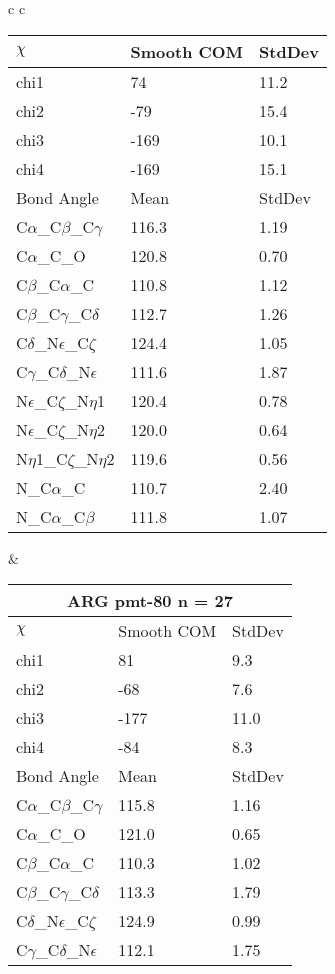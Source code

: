 \begin{longtable}{ c c }
\begin{tabular}{ l l l }
  $\chi$       & Smooth COM & StdDev \\ \midrule
  chi1 & 74 & 11.2 \\ 
  chi2 & -79 & 15.4 \\ 
  chi3 & -169 & 10.1 \\ 
  chi4 & -169 & 15.1 \\ \midrule
  Bond Angle   & Mean     & StdDev \\ \midrule
  C$\alpha$\_C$\beta$\_C$\gamma$ & 116.3 & 1.19\\
  C$\alpha$\_C\_O & 120.8 & 0.70\\
  C$\beta$\_C$\alpha$\_C & 110.8 & 1.12\\
  C$\beta$\_C$\gamma$\_C$\delta$ & 112.7 & 1.26\\
  C$\delta$\_N$\epsilon$\_C$\zeta$ & 124.4 & 1.05\\
  C$\gamma$\_C$\delta$\_N$\epsilon$ & 111.6 & 1.87\\
  N$\epsilon$\_C$\zeta$\_N$\eta$1 & 120.4 & 0.78\\
  N$\epsilon$\_C$\zeta$\_N$\eta$2 & 120.0 & 0.64\\
  N$\eta$1\_C$\zeta$\_N$\eta$2 & 119.6 & 0.56\\
  N\_C$\alpha$\_C & 110.7 & 2.40\\
  N\_C$\alpha$\_C$\beta$ & 111.8 & 1.07\\
  \bottomrule
  \end{tabular}
  &
  \begin{tabular}{ l l l }
  \toprule
  \multicolumn{3}{c}{ARG \textbf{pmt-80} n = 27} \\ \toprule
  $\chi$       & Smooth COM & StdDev \\ \midrule
  chi1 & 81 & 9.3 \\ 
  chi2 & -68 & 7.6 \\ 
  chi3 & -177 & 11.0 \\ 
  chi4 & -84 & 8.3 \\ \midrule
  Bond Angle   & Mean     & StdDev \\ \midrule
  C$\alpha$\_C$\beta$\_C$\gamma$ & 115.8 & 1.16\\
  C$\alpha$\_C\_O & 121.0 & 0.65\\
  C$\beta$\_C$\alpha$\_C & 110.3 & 1.02\\
  C$\beta$\_C$\gamma$\_C$\delta$ & 113.3 & 1.79\\
  C$\delta$\_N$\epsilon$\_C$\zeta$ & 124.9 & 0.99\\
  C$\gamma$\_C$\delta$\_N$\epsilon$ & 112.1 & 1.75\\

\end{tabular}
\end{longtable}
